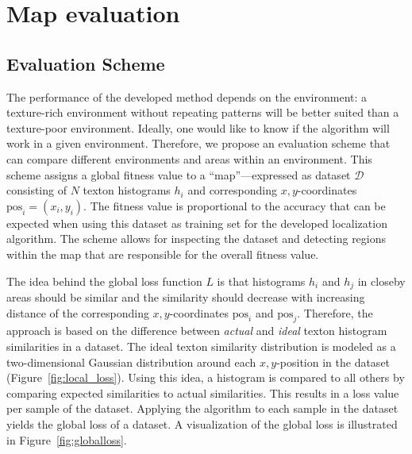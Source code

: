 \documentclass[11pt]{report}
\begin{document}
%

\section{Map evaluation}
\label{sec:mapeval}

\subsection{Evaluation Scheme}
\label{sec:evaluationscheme}

The performance of the developed method depends on the environment: a
texture-rich environment without repeating patterns will be better
suited than a texture-poor environment. Ideally, one would like to
know if the algorithm will work in a given environment. Therefore, we
propose an evaluation scheme that can compare different environments
and areas within an environment. This scheme assigns a global fitness
value to a ``map''---expressed as dataset $\mathcal{D}$ consisting of
$N$ texton histograms $h_i$ and corresponding $x,y$-coordinates
$\text{pos}_i = (x_i, y_i)$. The fitness value is proportional to the
accuracy that can be expected when using this dataset as training set
for the developed localization algorithm. The scheme allows for
inspecting the dataset and detecting regions within the map that are
responsible for the overall fitness value.

The idea behind the global loss function $L$ is that histograms $h_i$
and $h_j$ in closeby areas should be similar and the similarity should
decrease with increasing distance of the corresponding
$x,y$-coordinates $\text{pos}_i$ and $\text{pos}_j$. Therefore, the
approach is based on the difference between \emph{actual} and
\emph{ideal} texton histogram similarities in a dataset. The ideal
texton similarity distribution is modeled as a two-dimensional
Gaussian distribution around each $x,y$-position in the dataset
(Figure~\ref{fig:local_loss}). Using this idea, a histogram is
compared to all others by comparing expected similarities to actual
similarities. This results in a loss value per sample of the
dataset. Applying the algorithm to each sample in the dataset yields
the global loss of a dataset. A visualization of the global loss is
illustrated in Figure~\ref{fig:globalloss}.
\end{document}
